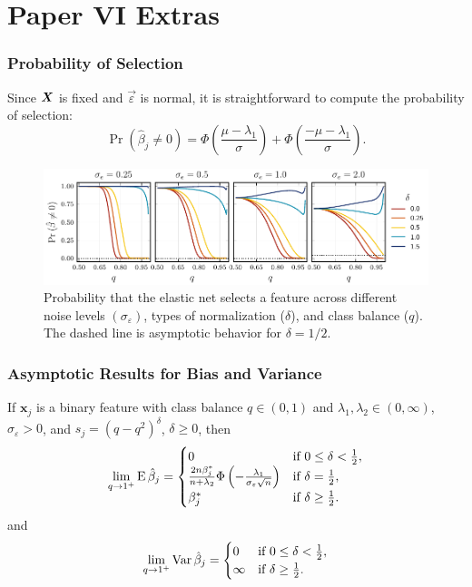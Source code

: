 \documentclass[10pt]{beamer}
\begin{document}
\section{Paper VI Extras}

\begin{frame}[c]
  \frametitle{Probability of Selection}

  Since \(\bm{X}\) is fixed and \(\vec{\varepsilon}\) is normal, it is straightforward to
  compute the probability of selection:
  \[
    \Pr(\hat{\beta}_j \neq 0) = \Phi\left(\frac{\mu - \lambda_1}{\sigma}\right) + \Phi\left(\frac{- \mu -\lambda_1}{\sigma}\right).
  \]

  \begin{figure}[htpb]
    \centering
    \includegraphics[width=\textwidth]{figures/paper6-selection_probability.pdf}
    \caption{%
      Probability that the elastic net selects a feature across different noise levels \((\sigma_\varepsilon)\), types of normalization (\(\delta\)), and class balance (\(q\)).
      The dashed line is asymptotic behavior for \(\delta = 1/2\).
    }
  \end{figure}
\end{frame}

\begin{frame}[c]
  \frametitle{Asymptotic Results for Bias and Variance}

  \begin{theorem}
    If \(\bm{x}_j\) is a binary feature with class balance \(q \in (0, 1)\) and \(\lambda_1,\lambda_2 \in (0,\infty)\), \(\sigma_\varepsilon > 0\), and \(s_j = (q - q^2)^{\delta}\), \(\delta \geq 0\), then
    \[
      \lim_{q \rightarrow 1^+} \operatorname{E} \hat{\beta}_j =
      \begin{cases}
        0                                                                                                  & \text{if } 0 \leq \delta < \frac{1}{2}, \\
        \frac{2n \beta_j^*}{n + \lambda_2} \Phi\left(-\frac{\lambda_1}{\sigma_\varepsilon \sqrt{n}}\right) & \text{if } \delta = \frac{1}{2},        \\
        \beta^*_j                                                                                          & \text{if } \delta \geq \frac{1}{2}.
      \end{cases}
    \]
    \pause and
    \[
      \lim_{q \rightarrow 1^+} \operatorname{Var} \hat{\beta}_j =
      \begin{cases}
        0      & \text{if } 0 \leq \delta < \frac{1}{2}, \\
        \infty & \text{if } \delta \geq \frac{1}{2}.
      \end{cases}
    \]
  \end{theorem}

\end{frame}
\end{document}

